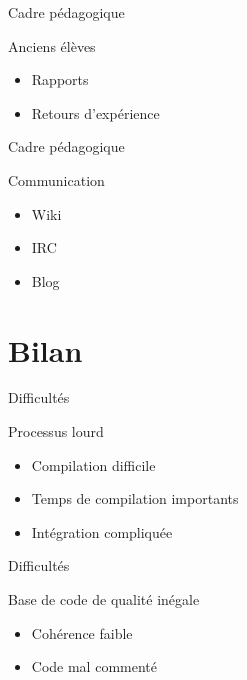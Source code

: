 \documentclass[handout]{beamer}
\begin{document}
\begin{frame}{Cadre pédagogique}
    \begin{block}{Anciens élèves}
        \begin{itemize}[<+->]
            \item Rapports
            \item Retours d'expérience
        \end{itemize}
    \end{block}
\end{frame}

\begin{frame}{Cadre pédagogique}
    \begin{block}{Communication}
        \begin{itemize}[<+->]
            \item Wiki
            \item IRC
            \item Blog
        \end{itemize}
    \end{block}
\end{frame}

\section{Bilan}
\begin{frame}{Difficultés}
    \begin{block}{Processus lourd}
        \begin{itemize}[<+->]
            \item Compilation difficile
            \item Temps de compilation importants
            \item Intégration compliquée
        \end{itemize}
    \end{block}
\end{frame}

\begin{frame}{Difficultés}
    \begin{block}{Base de code de qualité inégale}
        \begin{itemize}[<+->]
            \item Cohérence faible
            \item Code mal commenté
        \end{itemize}
    \end{block}
\end{frame}
\end{document}
